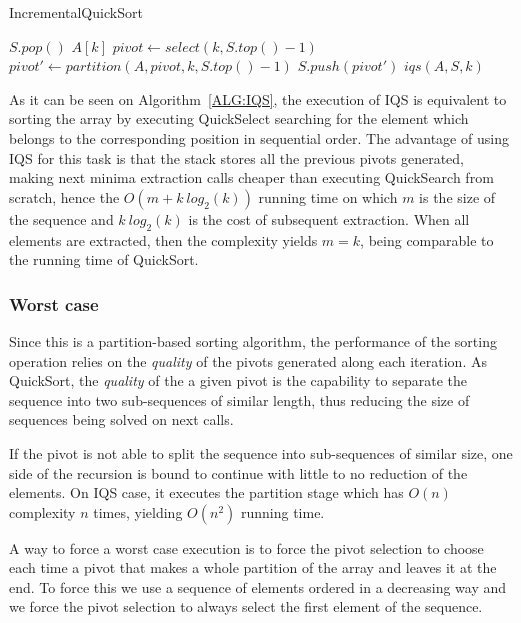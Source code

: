 \begin{algorithm}
  \caption{IncrementalQuickSort}\label{ALG:IQS}
  \begin{algorithmic}[1]
    \State $S.pop()$
    \Return $A[k]$
    \EndIf
    \State $pivot \gets select(k, S.top()-1)$
    \State $pivot' \gets partition(A,pivot,k, S.top()-1)$
    \State $S.push(pivot')$
    \State \Return $iqs(A,S,k)$
    \EndProcedure
  \end{algorithmic}
\end{algorithm}

As it can be seen on Algorithm~\ref{ALG:IQS}, the execution of IQS is equivalent to sorting the array by executing QuickSelect searching for the element which belongs to the corresponding position in sequential order. The advantage of using IQS for this task is that the stack stores all the previous pivots generated, making next minima extraction calls cheaper than executing QuickSearch from scratch, hence the $O(m + k~log_2(k) ) $ running time on which $m$ is the size of the sequence and $k~log_2(k)$ is the cost of subsequent extraction. When all elements are extracted, then the complexity yields $m = k$, being comparable to the running time of QuickSort.

\subsubsection{Worst case}
Since this is a partition-based sorting algorithm, the performance of the sorting operation relies on the \textit{quality} of the pivots generated along each iteration. As QuickSort, the \textit{quality} of the a given pivot is the capability to separate the sequence into two sub-sequences of similar length, thus reducing the size of sequences being solved on next calls.

If the pivot is not able to split the sequence into sub-sequences of similar size, one side of the recursion is bound to continue with little to no reduction of the elements. On IQS case, it executes the partition stage which has $O(n)$ complexity $n$ times, yielding $O(n^2)$ running time.

A way to force a worst case execution is to force the pivot selection to choose each time a pivot that makes a whole partition of the array and leaves it at the end. To force this we use a sequence of elements ordered in a decreasing way and we force the pivot selection to always select the first element of the sequence.

